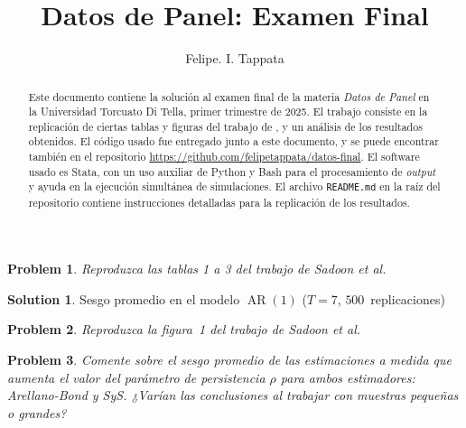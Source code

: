 \documentclass[12pt,letterpaper,reqno,oneside]{amsart}
\theoremstyle{problemstyle} %
\newtheorem{problem}{Problem}
\theoremstyle{definition} %
\newtheorem{solution}{Solution}[problem]
\DeclareMathOperator{\ar}{AR}
\begin{document}
\author[F. I. Tappata]{Felipe. I. Tappata}
\date{}

\title[Final Exam]{Datos de Panel: Examen Final}
\begin{abstract}
  Este documento contiene la solución al examen final de la materia \emph{Datos de Panel} en la Universidad Torcuato Di Tella, primer trimestre de 2025.
  El trabajo consiste en la replicación de ciertas tablas y figuras del trabajo de \textcite{al-sadoonSimpleMethodsConsistent2019}, y un análisis de los resultados obtenidos.
  El código usado fue entregado junto a este documento, y se puede encontrar también en el repositorio \url{https://github.com/felipetappata/datos-final}.
  El software usado es Stata, con un uso auxiliar de Python y Bash para el procesamiento de \emph{output} y ayuda en la ejecución simultánea de simulaciones.
  El archivo \texttt{README.md} en la raíz del repositorio contiene instrucciones detalladas para la replicación de los resultados.
\end{abstract}
\maketitle
\begin{mdframed}
  \begin{problem}
  \label{prob:1}
  Reproduzca las tablas 1 a 3 del trabajo de Sadoon et al.
  \end{problem}
\end{mdframed}
\begin{solution}
  \begin{table}[htbp]
    \centering
    \caption{Sesgo promedio en el modelo $\ar(1)$ ($T = 7$, $500$~replicaciones)}
    \label{tab:table1}
    
  \end{table}
\end{solution}
\begin{mdframed}
  \begin{problem}
  \label{prob:2}
  Reproduzca la figura~1 del trabajo de Sadoon et al.
  \end{problem}
\end{mdframed}
\begin{mdframed}
  \begin{problem}
  \label{prob:3}
  Comente sobre el sesgo promedio de las estimaciones a medida que aumenta el valor del parámetro de persistencia $\rho$ para ambos estimadores: Arellano-Bond y SyS. ¿Varían las conclusiones al trabajar con muestras pequeñas o grandes?

  \end{problem}
\end{mdframed}
\printbibliography
\end{document}
